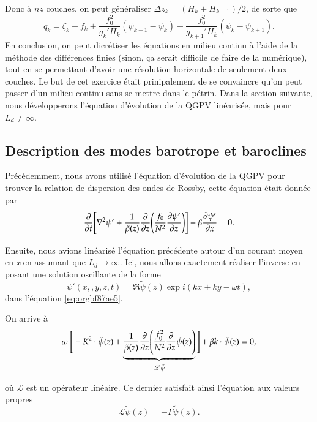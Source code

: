 \documentclass[10pt]{article}
\numberwithin{equation}{section}
\newcommand{\tpsi}{\tilde{\psi}}
\begin{document}
Donc à \(nz\) couches, on peut généraliser \(\Delta z_k = (H_k + H_{k-1})/2\), de sorte que
\begin{equation}
\label{eq:org17e0b27}
q_k = \zeta_k + f_k + \frac{f_0^2}{g_k' H_k}(\psi_{k-1} - \psi_k) - \frac{f_0^2}{g_{k+1}' H_k}(\psi_k - \psi_{k+1}).
\end{equation}
En conclusion, on peut dicrétiser les équations en milieu continu à l'aide de la méthode des différences finies (sinon, ça serait difficile de faire de la numérique), tout en se permettant d'avoir une résolution horizontale de seulement deux couches.
Le but de cet exercice était prinipalement de se convaincre qu'on peut passer d'un milieu continu sans se mettre dans le pétrin.
Dans la section suivante, nous développerons l'équation d'évolution de la QGPV linéarisée, mais pour \(L_d \not = \infty\).

\subsection{Description des modes barotrope et baroclines}
\label{sec:org006ba3d}
Précédemment, nous avons utilisé l'équation d'évolution de la QGPV pour trouver la relation de dispersion des ondes de Rossby, cette équation était donnée par
\begin{equation}
\label{eq:orgbf87ae5}
\pdv{t} \Bigg[ \laplacian \psi' + \frac{1}{\tilde{\rho}(z)}\pdv{z}\qty(\frac{f_0}{N^2}\pdv{\psi'}{z}) \Bigg] + \beta \pdv{\psi'}{x} = 0.
\end{equation}

Ensuite, nous avions linéarisé l'équation précédente autour d'un courant moyen en \emph{x} en assumant que \(L_d \rightarrow \infty\).
Ici, nous allons exactement réaliser l'inverse en posant une solution oscillante de la forme
\begin{equation}
\psi'(x,,y,z,t) = \Re \tpsi(z) \exp{ i(kx + ky - \omega t)},
\end{equation}
dans l'équation \ref{eq:orgbf87ae5}.\bigskip

On arrive à
\begin{equation}
\label{eq:orga6c3f7b}
\omega\ \Bigg[ - K^2 \cdot \tpsi(z) + \underbrace{\frac{1}{\tilde{\rho}(z)}\pdv{z}\qty(\frac{f_0^2}{N^2} \pdv{z}\tpsi(z))}_{\mathscr{L}\tpsi} \Bigg] + \beta k\cdot \tpsi(z) = 0,
\end{equation}

où \(\mathscr{L}\) est un opérateur linéaire.
Ce dernier satisfait ainsi l'équation aux valeurs propres
\begin{equation}
\mathscr{L}\tpsi(z) = - \Gamma \tpsi(z).
\end{equation}
\end{document}

